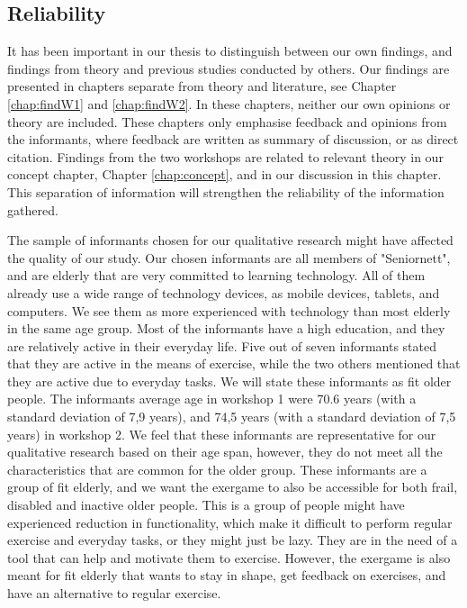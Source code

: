 \subsection{Reliability}
It has been important in our thesis to distinguish between our own findings, and findings from theory and previous studies conducted by others. Our findings are presented in chapters separate from theory and literature, see Chapter \ref{chap:findW1} and \ref{chap:findW2}. In these chapters, neither our own opinions or theory are included. These chapters only emphasise feedback and opinions from the informants, where feedback are written as summary of discussion, or as direct citation. Findings from the two workshops are related to relevant theory in our concept chapter, Chapter \ref{chap:concept}, and in our discussion in this chapter. This separation of information will strengthen the reliability of the information gathered.

The sample of informants chosen for our qualitative research might have affected the quality of our study. Our chosen informants are all members of "Seniornett", and are elderly that are very committed to learning technology. All of them already use a wide range of technology devices, as mobile devices, tablets, and computers. We see them as more experienced with technology than most elderly in the same age group. Most of the informants have a high education, and they are relatively active in their everyday life. Five out of seven informants stated that they are active in the means of exercise, while the two others mentioned that they are active due to everyday tasks. We will state these informants as fit older people. The informants average age in workshop 1 were 70.6 years (with a standard deviation of 7,9 years), and 74,5 years (with a standard deviation of 7,5 years) in workshop 2. We feel that these informants are representative for our qualitative research based on their age span, however, they do not meet all the characteristics that are common for the older group. These informants are a group of fit elderly, and we want the exergame to also be accessible for both frail, disabled and inactive older people. This is a group of people might have experienced reduction in functionality, which make it difficult to perform regular exercise and everyday tasks, or they might just be lazy. They are in the need of a tool that can help and motivate them to exercise. However, the exergame is also meant for fit elderly that wants to stay in shape, get feedback on exercises, and have an alternative to regular exercise. 

